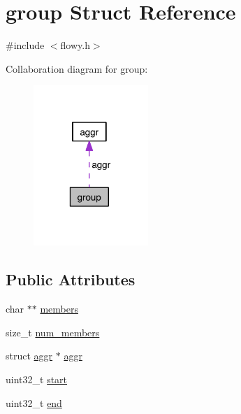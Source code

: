 \hypertarget{structgroup}{\section{group \-Struct \-Reference}
\label{structgroup}
}


{\ttfamily \#include $<$flowy.\-h$>$}



\-Collaboration diagram for group\-:
\nopagebreak
\begin{figure}[H]
\begin{center}
\leavevmode
\includegraphics[width=123pt]{structgroup__coll__graph}
\end{center}
\end{figure}
\subsection*{\-Public \-Attributes}
\begin{DoxyCompactItemize}
\item 
char $\ast$$\ast$ \hyperlink{structgroup_a4bb58cf13aa5a2f653c18385ba11b008}{members}
\item 
size\-\_\-t \hyperlink{structgroup_a3606a1f9876a73c5541e4e19f2b3cbba}{num\-\_\-members}
\item 
struct \hyperlink{structaggr}{aggr} $\ast$ \hyperlink{structgroup_abf1076c6debaaa605fdcfc46ca0ee97d}{aggr}
\item 
uint32\-\_\-t \hyperlink{structgroup_afd06fbd1169740e0a0994f9395467d77}{start}
\item 
uint32\-\_\-t \hyperlink{structgroup_a23a336dd7e472307769dfcc2c1bb8503}{end}
\end{DoxyCompactItemize}


